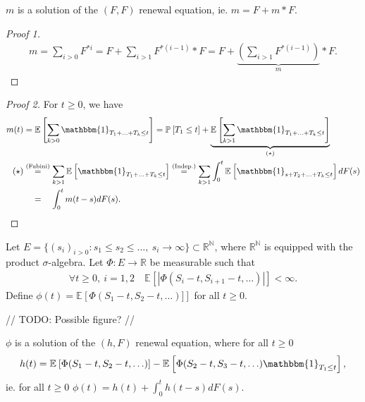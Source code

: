 \begin{prop}[]
	$m$ is a solution of the $(F,F)$ renewal equation, ie. $m=F+m*F$.	
\end{prop}
\begin{proof}[Proof 1]
\begin{align}
	m = \sum_{i> 0}^{} F^{*i} = F + \sum_{i> 1}^{} F^{*(i-1)}*F = F + \underbrace{\left( \sum_{i> 1}^{} F^{*(i-1)} \right)}_{m}*F.
\end{align}
\end{proof}
\begin{proof}[Proof 2]
For $t\geq 0$, we have
\begin{align}
	m(t)& = \mathbb{E}_{} \left[ \sum_{k> 0}^{} \mathbbm{1}_{T_1 + \ldots + T_k \leq t}  \right] = \mathbb{P}_{} \left[ T_1 \leq t \right] + \underbrace{\mathbb{E}_{} \left[ \sum_{k> 1}^{}\mathbbm{1}_{T_1 + \ldots + T_k \leq t}   \right]}_{(\star)} \\ 
	(\star) &\stackrel{\textrm{(Fubini)}}{=} \sum_{k> 1}^{} \mathbb{E}_{} \left[ \mathbbm{1}_{T_1 + \ldots + T_k \leq t}  \right] \stackrel{\textrm{(Indep.)}}{=} \sum_{k> 1}^{} \int_{0}^{t} \mathbb{E}_{} \left[ \mathbbm{1}_{s+T_2+\ldots+T_k \leq t}  \right] dF(s) \\
		&\stackrel{\textrm{\phantom{(Fubini)}}}{=} \int_{0}^{t} m(t-s)dF(s).
\end{align}
\end{proof}

\begin{ex}[Generalization]
	Let $E= \{ (s_i)_{i> 0}: s_1 \leq s_2\leq \ldots,\ s_{i}\to \infty\} \subset \mathbb{R}^{\mathbb{N}}$, where $\mathbb{R}^{\mathbb{N}}$ is equipped with the product $\sigma$-algebra.
	Let $\Phi:E \to \mathbb{R}$ be measurable such that
	\begin{align}
		\forall t\geq 0,\ i=1,2 \quad \mathbb{E}_{} \left[ | \Phi(S_i-t, S_{i+1}-t,\ldots)| \right] < \infty.
	\end{align}
	Define $\phi(t)=\mathbb{E}_{} \left[ \Phi(S_1-t, S_2-t,\ldots)] \right] $ for all $t\geq 0$.	
\end{ex}
{\color{blue} // TODO: Possible figure? //}

\begin{prop}[]
	$\phi$ is a solution of the $ (h,F)$ renewal equation, where for all $t\geq 0$
	\begin{align}
		h(t) = \mathbb{E}_{} \left[ \Phi(S_1 -t, S_2-t, \ldots) \right] - \mathbb{E}_{} \left[ \Phi(S_2 - t, S_3-t, \ldots)\mathbbm{1}_{T_1\leq t}  \right] ,	
	\end{align}
	ie. for all $t\geq 0$ $\phi(t) = h(t) + \int_{0}^{t} h(t-s)dF(s)$.
\end{prop}

